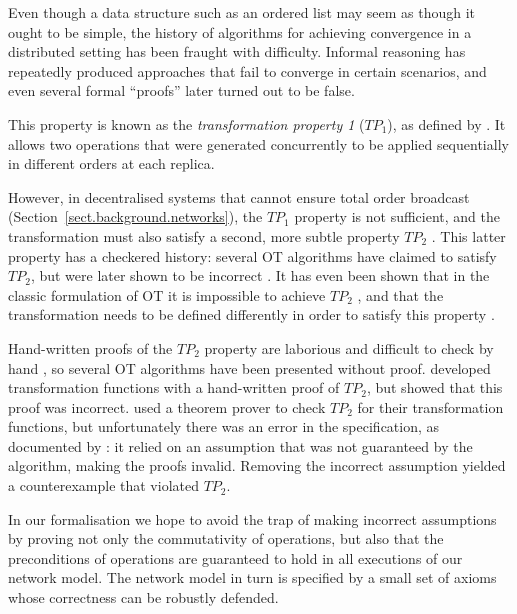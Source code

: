 Even though a data structure such as an ordered list may seem as though it ought to be simple, the
history of algorithms for achieving convergence in a distributed setting has been fraught with
difficulty. Informal reasoning has repeatedly produced approaches that fail to converge in certain
scenarios, and even several formal ``proofs'' later turned out to be false.



This property is known as the \emph{transformation property 1} ($\mathit{TP}_1$), as defined by
\citet{Ressel:1996wx}. It allows two operations that were generated concurrently to be applied
sequentially in different orders at each replica.

However, in decentralised systems that cannot ensure total order broadcast
(Section~\ref{sect.background.networks}), the $\mathit{TP}_1$ property is not sufficient, and the
transformation must also satisfy a second, more subtle property $\mathit{TP}_2$
\cite{Ressel:1996wx}. This latter property has a checkered history: several OT algorithms have
claimed to satisfy $\mathit{TP}_2$, but were later shown to be incorrect
\cite{Imine:2003ks,Imine:2006kn,Oster:2005vi}. It has even been shown that in the classic
formulation of OT it is impossible to achieve $\mathit{TP}_2$ \cite{Randolph:2015gj}, and that the
transformation needs to be defined differently in order to satisfy this property
\cite{Oster:2006tr}.

Hand-written proofs of the $\mathit{TP}_2$ property are laborious and difficult to check by hand
\cite{Li:2008hw,Li:2005jq}, so several OT algorithms have been presented without proof.
\citet{Suleiman:1998eu} developed transformation functions with a hand-written proof of
$\mathit{TP}_2$, but \citet{Oster:2005vi} showed that this proof was incorrect.
\citet{Imine:2003ks} used a theorem prover to check $\mathit{TP}_2$ for their transformation
functions, but unfortunately there was an error in the specification, as documented by
\citet{Oster:2005vi}: it relied on an assumption that was not guaranteed by the algorithm, making
the proofs invalid. Removing the incorrect assumption yielded a counterexample that violated
$\mathit{TP}_2$.

In our formalisation we hope to avoid the trap of making incorrect assumptions by proving not only
the commutativity of operations, but also that the preconditions of operations are guaranteed to
hold in all executions of our network model. The network model in turn is specified by a small set
of axioms whose correctness can be robustly defended.


